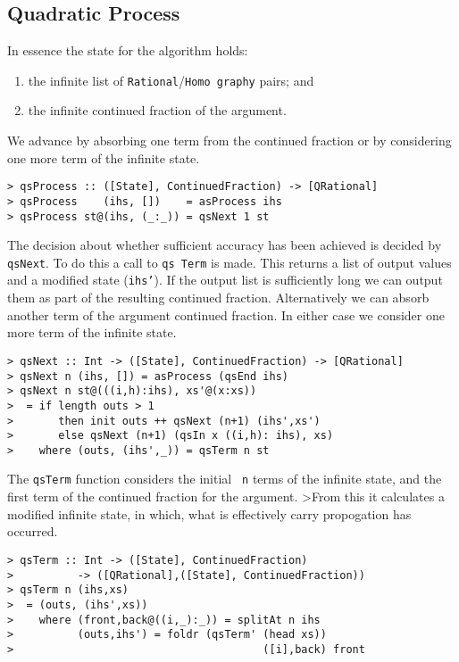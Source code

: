 \subsection{Quadratic Process}

In essence the state for the algorithm holds:
\begin{enumerate}
\item the infinite list of \mbox{\tt Rational}/\mbox{\tt Homo
graphy} pairs; and
\item the infinite continued fraction of the argument.
\end{enumerate}

We advance by absorbing one term from the continued fraction or by
considering one more term of the infinite state.
\begin{verbatim}
> qsProcess :: ([State], ContinuedFraction) -> [QRational]
> qsProcess    (ihs, [])    = asProcess ihs
> qsProcess st@(ihs, (_:_)) = qsNext 1 st
\end{verbatim}
%
%
%
The decision about whether sufficient accuracy has been achieved is
decided by \mbox{\tt qsNext}. To do this a call to \mbox{\tt qs
Term} is made. This
returns a list of output values and a modified state (\mbox{\tt ihs'}).  If the
output list is sufficiently long we can output them as part of the
resulting continued fraction. Alternatively we can absorb another term
of the argument continued fraction. In either case we consider one
more term of the infinite state.
\begin{verbatim}
> qsNext :: Int -> ([State], ContinuedFraction) -> [QRational]
> qsNext n (ihs, []) = asProcess (qsEnd ihs)
> qsNext n st@(((i,h):ihs), xs'@(x:xs))
>  = if length outs > 1
>       then init outs ++ qsNext (n+1) (ihs',xs')
>       else qsNext (n+1) (qsIn x ((i,h): ihs), xs)
>    where (outs, (ihs',_)) = qsTerm n st
\end{verbatim}
%
%
%
The \mbox{\tt qsTerm} function considers the initial \mbox{\tt 
n} terms of the infinite
state, and the first term of the continued fraction for the argument.
>From this it calculates a modified infinite state, in which, what is
effectively carry propogation has occurred.
\begin{verbatim}
> qsTerm :: Int -> ([State], ContinuedFraction)
>          -> ([QRational],([State], ContinuedFraction))
> qsTerm n (ihs,xs)
>  = (outs, (ihs',xs))
>    where (front,back@((i,_):_)) = splitAt n ihs
>          (outs,ihs') = foldr (qsTerm' (head xs))
>                                       ([i],back) front
\end{verbatim}
